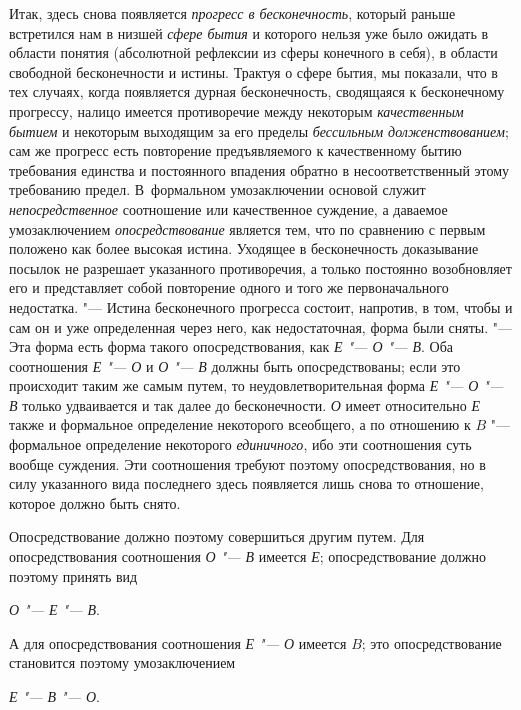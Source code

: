{{Итак, здесь снова появляется
{\em прогресс в бесконечность},
который раньше встретился нам в низшей
{\em сфере бытия} и
которого нельзя уже было ожидать в области понятия (абсолютной рефлексии из
сферы конечного в себя), в области свободной бесконечности и истины.
Трактуя о сфере бытия, мы показали, что в тех случаях, когда появляется
дурная бесконечность, сводящаяся к бесконечному прогрессу, налицо имеется
противоречие между некоторым
{\em качественным бытием}
и некоторым выходящим за его пределы
{\em бессильным долженствованием};
сам же прогресс есть повторение предъявляемого к
качественному бытию требования единства и постоянного впадения обратно в
несоответственный этому требованию предел. В~формальном умозаключении
основой служит {\em непосредственное}
соотношение или качественное суждение, а даваемое
умозаключением {\em опосредствование}
является тем, что по сравнению с первым положено как более
высокая истина. Уходящее в бесконечность доказывание посылок не разрешает
указанного противоречия, а только постоянно возобновляет его и представляет
собой повторение одного и того же первоначального недостатка. "---
Истина бесконечного прогресса состоит, напротив, в том, чтобы
и сам он и уже определенная через него, как недостаточная, форма были
сняты. "--- Эта форма есть форма такого опосредствования, как
{\em Е "--- О "--- В}. Оба соотношения {\em Е "--- О} и {\em О
"--- В} должны быть опосредствованы; если это
происходит таким же самым путем, то неудовлетворительная форма {\em Е "--- О
"--- В} только удваивается и так далее до
бесконечности. {\em О} имеет относительно {\em Е} также и
формальное определение некоторого всеобщего, а по отношению к
$B$ "--- формальное определение некоторого
{\em единичного}, ибо эти
соотношения суть вообще суждения. Эти соотношения требуют поэтому
опосредствования, но в силу указанного вида последнего здесь появляется
лишь снова то отношение, которое должно быть снято.

Опосредствование должно поэтому совершиться другим путем. Для
опосредствования соотношения {\em О "--- В} имеется
{\em Е}; опосредствование должно поэтому принять вид

{\centering
{\em О "--- Е
"--- В}.
\par}

А для опосредствования соотношения {\em Е "--- О}
имеется $B$; это опосредствование становится поэтому умозаключением

{\centering
{\em Е "--- В
"--- О}.
\par}

}}
